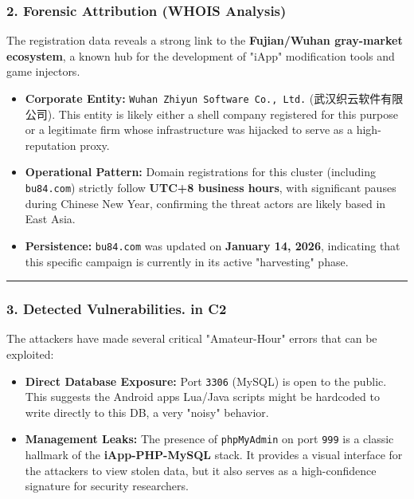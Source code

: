 \documentclass[
]{article}
\begin{document}
\subsubsection{2. Forensic Attribution (WHOIS
Analysis)}\label{2-forensic-attribution-whois-analysis}

The registration data reveals a strong link to the \textbf{Fujian/Wuhan
gray-market ecosystem}, a known hub for the development of "iApp"
modification tools and game injectors.

\begin{itemize}
\item
  \textbf{Corporate Entity:}
  \texttt{Wuhan\ Zhiyun\ Software\ Co.,\ Ltd.} (武汉织云软件有限公司).
  This entity is likely either a shell company registered for this
  purpose or a legitimate firm whose infrastructure was hijacked to
  serve as a high-reputation proxy.
\item
  \textbf{Operational Pattern:} Domain registrations for this cluster
  (including \texttt{bu84.com}) strictly follow \textbf{UTC+8 business
  hours}, with significant pauses during Chinese New Year, confirming
  the threat actors are likely based in East Asia.
\item
  \textbf{Persistence:} \texttt{bu84.com} was updated on \textbf{January
  14, 2026}, indicating that this specific campaign is currently in its
  active "harvesting" phase.
\end{itemize}

\begin{center}\rule{0.5\linewidth}{0.5pt}\end{center}

\subsubsection{3. Detected Vulnerabilities. in
C2}\label{3-detected-vulnerabilities-in-c2}

The attackers have made several critical "Amateur-Hour" errors that can
be exploited:

\begin{itemize}
\item
  \textbf{Direct Database Exposure:} Port \texttt{3306} (MySQL) is open
  to the public. This suggests the Android app\textquotesingle s
  Lua/Java scripts might be hardcoded to write directly to this DB, a
  very "noisy" behavior.
\item
  \textbf{Management Leaks:} The presence of \texttt{phpMyAdmin} on port
  \texttt{999} is a classic hallmark of the \textbf{iApp-PHP-MySQL}
  stack. It provides a visual interface for the attackers to view stolen
  data, but it also serves as a high-confidence signature for security
  researchers.
\end{itemize}
\end{document}
